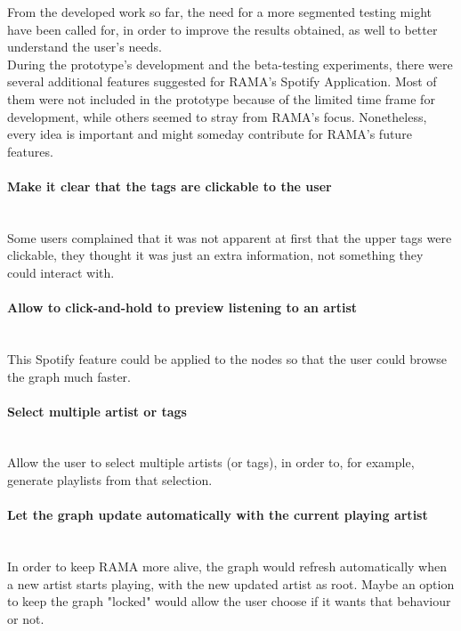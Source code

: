   From the developed work so far, the need for a more segmented testing might have been called for, in order to improve the results obtained, as well to better understand the user's needs. \\

  During the prototype's development and the beta-testing experiments, there were several additional features suggested for RAMA's Spotify Application.
  Most of them were not included in the prototype because of the limited time frame for development, while others seemed to stray from RAMA's focus.
  Nonetheless, every idea is important and might someday contribute for RAMA's future features.

  \paragraph*{Make it clear that the tags are clickable to the user} \hfill \\
  \indent Some users complained that it was not apparent at first that the upper tags were clickable, they thought it was just an extra information, not something they could interact with.

  \paragraph*{Allow to click-and-hold to preview listening to an artist} \hfill \\
  \indent This Spotify feature could be applied to the nodes so that the user could browse the graph much faster.

  \paragraph*{Select multiple artist or tags} \hfill \\
  \indent Allow the user to select multiple artists (or tags), in order to, for example, generate playlists from that selection.

  \paragraph*{Let the graph update automatically with the current playing artist} \hfill \\
  \indent In order to keep RAMA more alive, the graph would refresh automatically when a new artist starts playing, with the new updated artist as root.
  Maybe an option to keep the graph "locked" would allow the user choose if it wants that behaviour or not.

